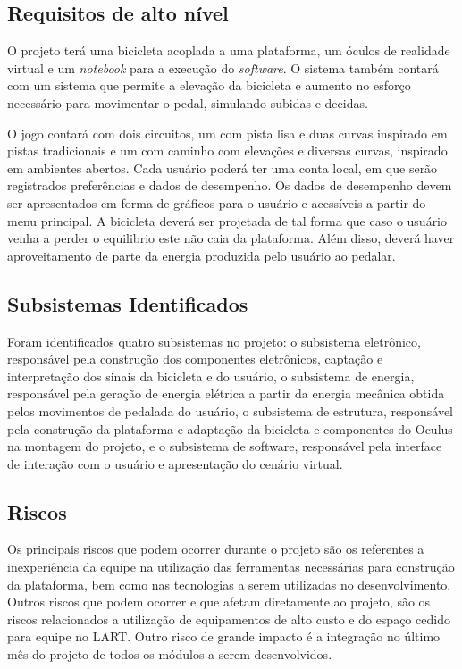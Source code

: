 \begin{apendicesenv}
\subsection{Requisitos de alto nível}

O projeto terá uma bicicleta acoplada a uma plataforma, um óculos de realidade virtual e um \textit{notebook} para a execução do \textit{software}. O sistema também contará com um sistema que permite a elevação da bicicleta e aumento no esforço necessário para movimentar o pedal, simulando subidas e decidas.

O jogo contará com dois circuitos, um com pista lisa e duas curvas inspirado em pistas tradicionais e um com caminho com elevações e diversas curvas, inspirado em ambientes abertos. Cada usuário poderá ter uma conta local, em que serão registrados preferências e dados de desempenho. Os dados de desempenho devem ser apresentados em forma de gráficos para o usuário e acessíveis a partir do menu principal. A bicicleta deverá ser projetada de tal forma que caso o usuário venha a perder o equilibrio este não caia da plataforma. Além disso, deverá haver aproveitamento de parte da energia produzida pelo usuário ao pedalar.
 
\subsection{Subsistemas Identificados}

Foram identificados quatro subsistemas no projeto: o subsistema eletrônico, responsável pela construção dos componentes eletrônicos, captação e interpretação dos sinais da bicicleta e do usuário, o subsistema de energia, responsável pela geração de energia elétrica a partir da energia mecânica obtida pelos movimentos de pedalada do usuário, o subsistema de estrutura, responsável pela construção da plataforma e adaptação da bicicleta e componentes do Oculus na montagem do projeto, e o subsistema de software, responsável pela interface de interação com o usuário e apresentação do cenário virtual.

\subsection{Riscos}

Os principais riscos que podem ocorrer durante o projeto são os referentes a inexperiência da equipe na utilização das ferramentas necessárias para construção da plataforma, bem como nas tecnologias a serem utilizadas no desenvolvimento. Outros riscos que podem ocorrer e que afetam diretamente ao projeto, são os riscos relacionados a utilização de equipamentos de alto custo e do espaço cedido para equipe no LART. Outro risco de grande impacto é a integração no último mês do projeto de todos os módulos a serem desenvolvidos.


\end{apendicesenv}
